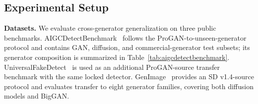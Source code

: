 \documentclass[lettersize,journal]{IEEEtran}
\begin{document}
\subsection{Experimental Setup}
\label{sec:experimental_setup}

\textbf{Datasets.}
We evaluate cross-generator generalization on three public benchmarks. AIGCDetectBenchmark~\cite{zhong2023patchcraft} follows the ProGAN-to-unseen-generator protocol and contains GAN, diffusion, and commercial-generator test subsets; its generator composition is summarized in Table~\ref{tab:aigcdetectbenchmark}. UniversalFakeDetect~\cite{ojha2023univfd} is used as an additional ProGAN-source transfer benchmark with the same locked detector. GenImage~\cite{zhu2023genimage} provides an SD v1.4-source protocol and evaluates transfer to eight generator families, covering both diffusion models and BigGAN.
\end{document}
